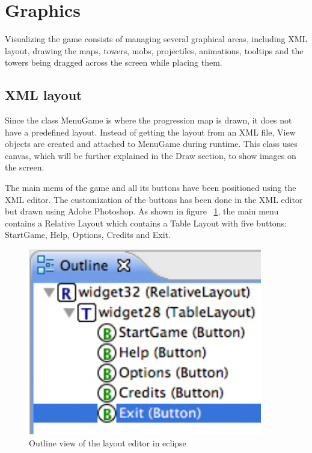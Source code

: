 \section{Graphics}

Visualizing the game consists of managing several graphical areas, including XML layout, drawing the maps, towers, mobs, projectiles, animations, tooltips and the towers being dragged across the screen while placing them.

\subsection{XML layout}

Since the class MenuGame is where the progression map is drawn, it does not have a predefined layout. Instead of getting the layout from an XML file, View objects are created and attached to MenuGame during runtime. This class uses canvas, which will be further explained in the Draw section, to show images on the screen. 

The main menu of the game and all its buttons have been positioned using the XML editor. The customization of the buttons has been done in the XML editor but drawn using Adobe Photoshop. As shown in figure ~\ref{fig:xmlLayout}, the main menu contains a Relative Layout which contains a Table Layout with five buttons: StartGame, Help, Options, Credits and Exit.

\begin{figure}[here]
\begin{center}
\includegraphics[scale=0.7]{pics/chapters/chapter4/xmllayout}
\end{center}
\caption{Outline view of the layout editor in eclipse}
\label{fig:xmlLayout}
\end{figure}

